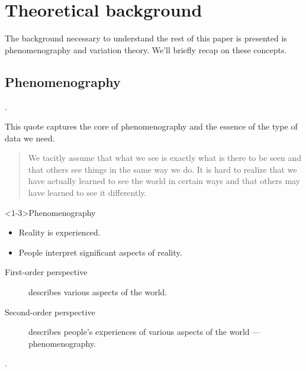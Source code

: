 \mode*
\section{Theoretical background}

The background necessary to understand the rest of this paper is presented is 
phenomenography and variation theory.
We'll briefly recap on these concepts.

\subsection{Phenomenography}

\begin{frame}
  .
\end{frame}
This quote captures the core of phenomenography and the essence of the type of 
data we need.

\blockcquote{NCOL}{%
  We tacitly assume that what we see is exactly what is there to be seen and 
  that others see things in the same way we do. It is hard to realize that we 
  have actually learned to see the world in certain ways and that others may 
  have learned to see it differently.
}

\begin{frame}
  \begin{block}<1-3>{Phenomenography~\parencite{Phenomenography}}
    \begin{itemize}
      \item Reality is experienced.
      \item People interpret significant aspects of reality.
    \end{itemize}
    \pause
    \begin{description}
      \item[First-order perspective] describes various aspects of the world.
      \item[Second-order perspective] describes people's experiences of various 
        aspects of the world --- phenomenography.
    \end{description}
  \end{block}

  \pause

  \begin{remark}
    .
  \end{remark}
\end{frame}

